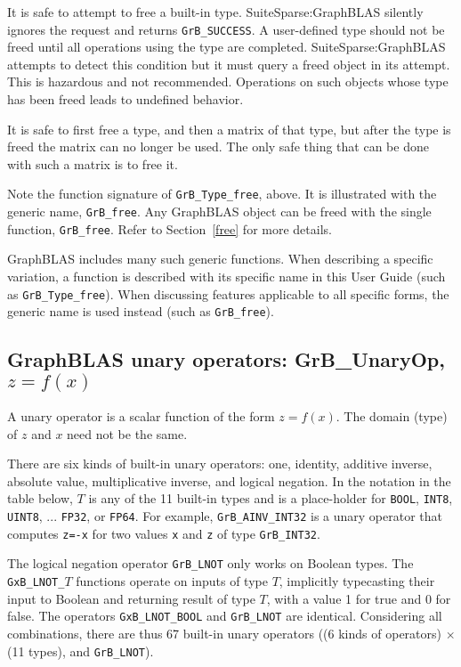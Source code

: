 \documentclass[12pt]{article}
\begin{document}
It is safe to attempt to free a built-in type.  SuiteSparse:GraphBLAS silently
ignores the request and returns \verb'GrB_SUCCESS'.  A user-defined type should
not be freed until all operations using the type are completed.
SuiteSparse:GraphBLAS attempts to detect this condition but it must query a
freed object in its attempt.  This is hazardous and not recommended.
Operations on such objects whose type has been freed leads to undefined
behavior.

It is safe to first free a type, and then a matrix of that type, but after the
type is freed the matrix can no longer be used.  The only safe thing that can
be done with such a matrix is to free it.

Note the function signature of \verb'GrB_Type_free', above.  It is illustrated
with the generic name, \verb'GrB_free'.  Any GraphBLAS object can be freed with
the single function, \verb'GrB_free'.  Refer to Section~\ref{free} for more
details.

GraphBLAS includes many such generic functions.  When describing a specific
variation, a function is described with its specific name in this User Guide
(such as \verb'GrB_Type_free').  When discussing features applicable to all
specific forms, the generic name is used instead (such as \verb'GrB_free').

\newpage
\subsection{GraphBLAS unary operators: {\sf GrB\_UnaryOp}, $z=f(x)$} %
\label{unaryop}

A unary operator is a scalar function of the form $z=f(x)$.  The domain (type)
of $z$ and $x$ need not be the same.

There are six kinds of built-in unary operators: one, identity,
additive inverse, absolute value,
multiplicative inverse, and logical negation.  In the notation in the table
below, $T$ is any of the 11 built-in types and is a place-holder for
\verb'BOOL', \verb'INT8', \verb'UINT8', ...  \verb'FP32', or \verb'FP64'.   For
example, \verb'GrB_AINV_INT32' is a unary operator that computes \verb'z=-x'
for two values \verb'x' and \verb'z' of type \verb'GrB_INT32'.

The logical negation operator \verb'GrB_LNOT' only works on Boolean types.  The
\verb'GxB_LNOT_'$T$ functions operate on inputs of type $T$, implicitly
typecasting their input to Boolean and returning result of type $T$, with a
value 1 for true and 0 for false.  The operators \verb'GxB_LNOT_BOOL' and
\verb'GrB_LNOT' are identical.
Considering all combinations, there are thus 67 built-in unary operators
((6 kinds of operators) $\times$ (11 types), and \verb'GrB_LNOT').
\end{document}
